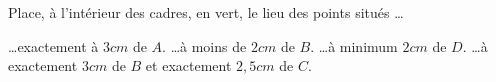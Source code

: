 %
%
Place, à l'intérieur des cadres, en vert, le lieu des points situés \dots
  \begin{tasks}
    \task \dots exactement à $3cm$ de $A$.
    \task \dots à moins de $2cm$ de $B$.
    \task \dots à minimum $2cm$ de $D$.
    \task \dots à exactement $3cm$ de $B$ et exactement $2,5cm$ de $C$. %
  \end{tasks}
